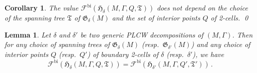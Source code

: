 \documentclass[11pt]{amsart}
\newtheorem{cor}[thm]{Corollary}
\newtheorem{lemma}[thm]{Lemma}
\theoremstyle{definition}
\numberwithin{equation}{section}
\def\cgpt{\mathscr{F}}
\newcommand{\ourGraph}{\fG}
\newcommand{\spnTree}{\fT}
\def\de{\delta}
\def\fG{\mathfrak{G}}
\def\fH{\mathfrak{H}}
\def\fT{{\mathfrak{T}}}
\begin{document}
\begin{cor}\label{cor:T-Q-indep}
The value $\cgpt^\mathrm{bi}(\fH_{\de}(M, \Gamma, Q, \spnTree))$ does not depend on the choice of the spanning tree $\spnTree$ of $\ourGraph_{\de}(M)$ and the set of interior points $Q$ of 2-cells.  \qed
\end{cor}

\begin{lemma}\label{lem:de-indep}
Let $\de$ and $\de'$ be two generic PLCW decompositions of $(M, \Gamma)$. Then for any choice of spanning trees of $\ourGraph_{\de}(M)$ (resp.~$\ourGraph_{\de'}(M)$) and any choice of interior points $Q$ (resp.~$Q'$) of boundary 2-cells of $\de$ (resp.~$\de'$), we have \begin{equation}\label{eq:de-inv}
\cgpt^\mathrm{bi}(\fH_{\de}(M, \Gamma, Q, \spnTree)) = \cgpt^\mathrm{bi}(\fH_{\de'}(M, \Gamma, Q', \spnTree'))\,.
\end{equation}
\end{lemma}
\end{document}
